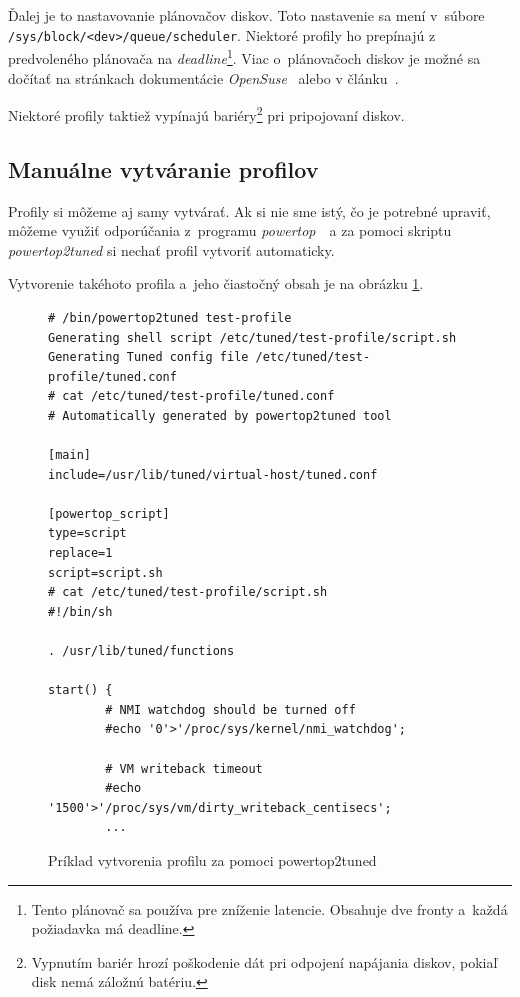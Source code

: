 Ďalej je to nastavovanie plánovačov diskov. Toto nastavenie sa mení v~súbore
\texttt{/sys\-/block\-/<dev>\-/queue\-/scheduler}. Niektoré profily ho prepínajú z
predvoleného plánovača na \emph{deadline}\footnote{Tento plánovač sa používa
pre zníženie latencie. Obsahuje dve fronty a~každá požiadavka má deadline.}.
Viac o~plánovačoch diskov je možné sa dočítať na stránkach dokumentácie
\emph{OpenSuse}~\cite{suse:scheduler} alebo v článku~\cite{book:scheduler}.

Niektoré profily taktiež vypínajú bariéry\footnote{Vypnutím bariér hrozí
poškodenie dát pri odpojení napájania diskov, pokiaľ disk nemá záložnú
batériu.} pri pripojovaní diskov. 

%
%

\subsection{Manuálne vytváranie profilov}
\label{sec:powertop2tuned}

Profily si môžeme aj samy vytvárať. Ak si nie sme istý, čo je potrebné upraviť,
môžeme využiť odporúčania z~programu \emph{powertop}~\cite{powertopHomepage}~a
za pomoci skriptu \emph{powertop2tuned} si nechať profil vytvoriť automaticky.

Vytvorenie takéhoto profila a~jeho čiastočný obsah je na obrázku \ref{alg:powertop2tuned}.

\begin{figure}[H]
\begin{lstlisting}
# /bin/powertop2tuned test-profile
Generating shell script /etc/tuned/test-profile/script.sh
Generating Tuned config file /etc/tuned/test-profile/tuned.conf
# cat /etc/tuned/test-profile/tuned.conf
# Automatically generated by powertop2tuned tool

[main]
include=/usr/lib/tuned/virtual-host/tuned.conf

[powertop_script]
type=script
replace=1
script=script.sh
# cat /etc/tuned/test-profile/script.sh
#!/bin/sh

. /usr/lib/tuned/functions

start() {
        # NMI watchdog should be turned off
        #echo '0'>'/proc/sys/kernel/nmi_watchdog';

        # VM writeback timeout
        #echo '1500'>'/proc/sys/vm/dirty_writeback_centisecs';
        ...
\end{lstlisting}
\caption{Príklad vytvorenia profilu za pomoci powertop2tuned}
\label{alg:powertop2tuned}
\end{figure}

